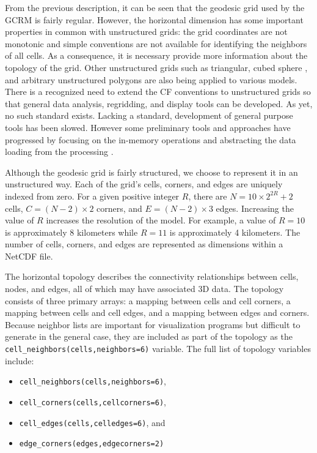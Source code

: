 From the previous description, it can be seen that the geodesic grid used by
the GCRM is fairly regular.  However, the horizontal dimension has some
important properties in common with unstructured grids: the grid coordinates
are not monotonic and simple conventions are not available for identifying the
neighbors of all cells.  As a consequence, it is necessary provide more
information about the topology of the grid.  Other unstructured grids such as
triangular, cubed sphere \cite{CUBE}, and arbitrary unstructured polygons are
also being applied to various models.  There is a recognized need to extend
the CF conventions to unstructured grids so that general data analysis,
regridding, and display tools can be developed.  As yet, no such standard
exists.  Lacking a standard, development of general purpose tools has been
slowed.  However some preliminary tools and approaches have progressed by
focusing on the in-memory operations and abstracting the data loading from the
processing \cite{UGRID}. 

Although the geodesic grid is fairly structured, we choose to represent it in
an unstructured way.  Each of the grid's cells, corners, and edges are
uniquely indexed from zero.  For a given positive integer $R$, there are $N =
10 \times 2^{2R} + 2$ cells, $C = (N-2) \times 2$ corners, and $E = (N-2)
\times 3$ edges.  Increasing the value of $R$ increases the resolution of the
model.  For example, a value of $R=10$ is approximately 8 kilometers while
$R=11$ is approximately 4 kilometers.  The number of cells, corners, and edges
are represented as dimensions within a NetCDF file.

The horizontal topology describes the connectivity relationships between
cells, nodes, and edges, all of which may have associated 3D data.  The
topology consists of three primary arrays: a mapping between cells and cell
corners, a mapping between cells and cell edges, and a mapping between edges
and corners.  Because neighbor lists are important for visualization programs
but difficult to generate in the general case, they are included as part of
the topology as the \verb+cell_neighbors(cells,neighbors=6)+ variable.  The
full list of topology variables include:

\begin{itemize}
\item \verb+cell_neighbors(cells,neighbors=6)+,
\item \verb+cell_corners(cells,cellcorners=6)+,
\item \verb+cell_edges(cells,celledges=6)+, and
\item \verb+edge_corners(edges,edgecorners=2)+
\end{itemize}

